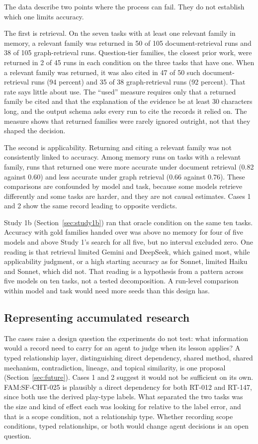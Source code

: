 \documentclass[11pt]{article}
\begin{document}
The data describe two points where the process can fail. They do not establish which one limits accuracy.

The first is retrieval. On the seven tasks with at least one relevant family in memory, a relevant family was returned in 50 of 105 document-retrieval runs and 38 of 105 graph-retrieval runs. Question-tier families, the closest prior work, were returned in 2 of 45 runs in each condition on the three tasks that have one. When a relevant family was returned, it was also cited in 47 of 50 such document-retrieval runs (94 percent) and 35 of 38 graph-retrieval runs (92 percent). That rate says little about use. The ``used'' measure requires only that a returned family be cited and that the explanation of the evidence be at least 30 characters long, and the output schema asks every run to cite the records it relied on. The measure shows that returned families were rarely ignored outright, not that they shaped the decision.

The second is applicability. Returning and citing a relevant family was not consistently linked to accuracy. Among memory runs on tasks with a relevant family, runs that returned one were more accurate under document retrieval (0.82 against 0.60) and less accurate under graph retrieval (0.66 against 0.76). These comparisons are confounded by model and task, because some models retrieve differently and some tasks are harder, and they are not causal estimates. Cases 1 and 2 show the same record leading to opposite verdicts.

Study 1b (Section~\ref{sec:study1b}) ran that oracle condition on the same ten tasks. Accuracy with gold families handed over was above no memory for four of five models and above Study 1's search for all five, but no interval excluded zero. One reading is that retrieval limited Gemini and DeepSeek, which gained most, while applicability judgment, or a high starting accuracy as for Sonnet, limited Haiku and Sonnet, which did not. That reading is a hypothesis from a pattern across five models on ten tasks, not a tested decomposition. A run-level comparison within model and task would need more seeds than this design has.

\subsection{Representing accumulated research}

The cases raise a design question the experiments do not test: what information would a record need to carry for an agent to judge when its lesson applies? A typed relationship layer, distinguishing direct dependency, shared method, shared mechanism, contradiction, lineage, and topical similarity, is one proposal (Section~\ref{sec:future}). Cases 1 and 2 suggest it would not be sufficient on its own. FAM:SF-CHT-025 is plausibly a direct dependency for both RT-012 and RT-147, since both use the derived play-type labels. What separated the two tasks was the size and kind of effect each was looking for relative to the label error, and that is a scope condition, not a relationship type. Whether recording scope conditions, typed relationships, or both would change agent decisions is an open question.
\end{document}
